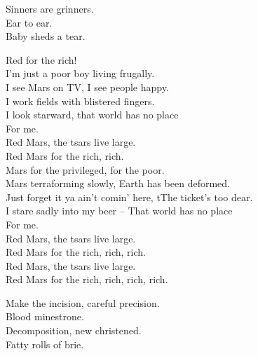 Sinners are grinners. \\
Ear to ear. \\
Baby  sheds a tear. \\





Red  for the rich! \\

I'm just a poor boy living frugally. \\
I see Mars on TV, I see people happy. \\
I work fields with blistered fingers. \\
I look starward, that world has no place \\
For me. \\

Red Mars, the tsars live large. \\
Red Mars for the rich, rich. \\

Mars for the privileged,  for the poor. \\
Mars terraforming slowly, Earth has been deformed. \\
Just forget it ya ain't comin' here, tThe ticket's too dear. \\
I stare sadly into my beer -- That world has no place \\
For me. \\

Red Mars, the tsars live large. \\
Red Mars for the rich, rich, rich. \\

Red Mars, the tsars live large. \\
Red Mars for the rich, rich, rich, rich. \\





Make the incision, careful precision. \\
Blood minestrone. \\
Decomposition, new  christened. \\
Fatty rolls of brie. \\

